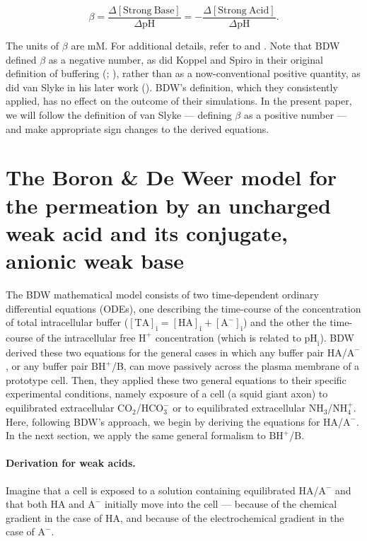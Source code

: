 \documentclass[fleqn,10pt]{physiome}
\begin{document}
\begin{equation}
\beta=\dfrac{\Delta\mathrm{[Strong~Base]}}{\Delta \mathrm{pH}}=-\dfrac{\Delta\mathrm{[Strong~Acid]}}{\Delta \mathrm{pH}}.
\label{eqn:buffer}
\end{equation}

The units of $\beta$ are mM. For additional details, refer to \cite{roos1981intracellular} and \cite{boron2016medical}. Note that BDW defined $\beta$ as a negative number, as did Koppel and Spiro in their original definition of buffering (\cite{koppel1914wirkung}; \cite{roos1980buffer}), rather than as a now-conventional positive quantity, as did van Slyke in his later work (\cite{van1922measurement}). BDW's definition, which they consistently applied, has no effect on the outcome of their simulations. In the present paper, we will follow the definition of van Slyke --- defining $\beta$ as a positive number --- and make appropriate sign changes to the derived equations.

\section{The Boron \& De Weer model for the permeation by an uncharged weak acid and its conjugate, anionic weak base}

The BDW mathematical model consists of two time-dependent ordinary differential equations (ODEs), one describing the time-course of the concentration of total intracellular buffer ($\mathrm{[TA]_i = [HA]_i+[A^-]_i}$) and the other the time-course of the intracellular free $\mathrm{H^+}$ concentration (which is related to $\mathrm{{pH}_i}$). BDW derived these two equations for the general cases in which any buffer pair HA/$\mathrm{A^-}$, or any buffer pair $\mathrm{BH^+}$/B, can move passively across the plasma membrane of a prototype cell. Then, they applied these two general equations to their specific experimental conditions, namely exposure of a cell (a squid giant axon) to equilibrated extracellular $\mathrm{CO_2}$/$\mathrm{HCO_3^-}$ or to equilibrated extracellular $\mathrm{NH_3}$/$\mathrm{NH_4^+}$.\\

Here, following BDW's approach, we begin by deriving the equations for HA/$\mathrm{A^-}$. In the next section, we apply the same general formalism to $\mathrm{BH^+}$/B.


\paragraph{Derivation for weak acids.}
Imagine that a cell is exposed to a solution containing equilibrated $\mathrm{HA}$/$\mathrm{A^-}$ and that both $\mathrm{HA}$ and $\mathrm{A^-}$ initially move into the cell --- because of the chemical gradient in the case of $\mathrm{HA}$, and because of the electrochemical gradient in the case of $\mathrm{A^-}$.\\
\end{document}
